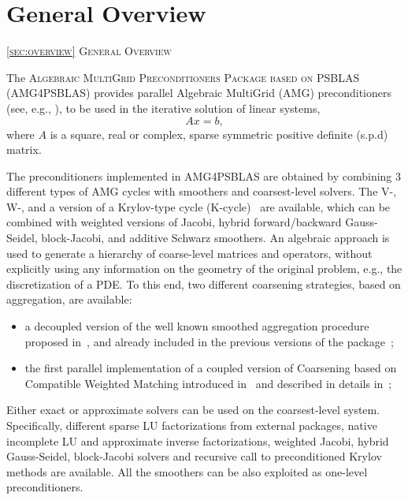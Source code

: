 \section{General Overview\label{sec:overview}}
         {\textsc{\ref{sec:overview} General Overview}}

The \textsc{Algebraic MultiGrid Preconditioners Package based on
PSBLAS (AMG4PSBLAS)} provides parallel Algebraic MultiGrid (AMG) preconditioners (see, e.g., \cite{Briggs2000,Stuben_01}),
to be used in the iterative solution of  linear systems,
\begin{equation}
Ax=b,
\label{system1}
\end{equation}
where $A$ is a square, real or complex, sparse symmetric positive definite (s.p.d) matrix.
%
%

The preconditioners implemented in AMG4PSBLAS are obtained by combining
3 different types of AMG cycles with smoothers and coarsest-level solvers. The V-, W-, and a version of a Krylov-type cycle (K-cycle)~\cite{Briggs2000,Notay2008} are available, which can be combined with weighted versions of Jacobi, hybrid
forward/backward Gauss-Seidel, block-Jacobi, and additive Schwarz smoothers. An algebraic approach is used to generate a hierarchy of
coarse-level matrices and operators, without explicitly using any information on the
geometry of the original problem, e.g., the discretization of a PDE. To this end,
two different coarsening strategies, based on aggregation, are available:
\begin{itemize}
\item a decoupled version of the well known smoothed aggregation procedure proposed in~\cite{BREZINA_VANEK,VANEK_MANDEL_BREZINA}, and already included in the previous versions of the package~\cite{BDDF2007,MLD2P4_TOMS};
\item the first parallel implementation of a coupled version of Coarsening based on Compatible Weighted Matching introduced in~\cite{DV2013,DFV2018} and described in details in~\cite{DDF2020};
\end{itemize}

Either exact or approximate solvers can be used on the coarsest-level system. Specifically, different sparse LU factorizations from external
packages, native incomplete LU and approximate inverse factorizations, weighted Jacobi, hybrid Gauss-Seidel, block-Jacobi solvers and recursive call to preconditioned Krylov methods are available. All the smoothers can be also exploited as one-level
preconditioners.

